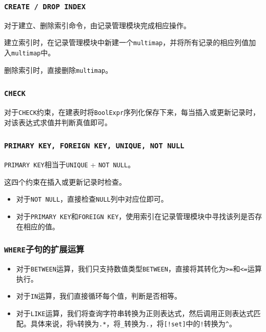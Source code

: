 \documentclass[11pt, a4paper]{article}
\begin{document}
\subsubsection{\texttt{CREATE / DROP INDEX}}

对于建立、删除索引命令，由记录管理模块完成相应操作。

建立索引时，在记录管理模块中新建一个\texttt{multimap}，并将所有记录的相应列值加入\texttt{multimap}中。

删除索引时，直接删除\texttt{multimap}。

\subsubsection{\texttt{CHECK}}

对于\texttt{CHECK}约束，在建表时将\texttt{BoolExpr}序列化保存下来，每当插入或更新记录时，对该表达式求值并判断真值即可。

\subsubsection{\texttt{PRIMARY KEY, FOREIGN KEY, UNIQUE, NOT NULL}}

\texttt{PRIMARY KEY}相当于\texttt{UNIQUE} + \texttt{NOT NULL}。

这四个约束在插入或更新记录时检查。

\begin{itemize}
\item 对于\texttt{NOT NULL}，直接检查\texttt{NULL}列中对应位即可。
\item 对于\texttt{PRIMARY KEY}和\texttt{FOREIGN KEY}，使用索引在记录管理模块中寻找该列是否存在相应的值。
\end{itemize}

\subsubsection{\texttt{WHERE}子句的扩展运算}

\begin{itemize}
\item 对于\texttt{BETWEEN}运算，我们只支持数值类型\texttt{BETWEEN}，直接将其转化为\texttt{>=}和\texttt{<=}运算执行。
\item 对于\texttt{IN}运算，我们直接循环每个值，判断是否相等。
\item 对于\texttt{LIKE}运算，我们将查询字符串转换为正则表达式，然后调用正则表达式匹配。具体来说，将\texttt{\%}转换为\texttt{.*}，将\texttt{\_}转换为\texttt{.}，将\texttt{[!set]}中的\texttt{!}转换为\texttt{\^}。
\end{itemize}
\end{document}
